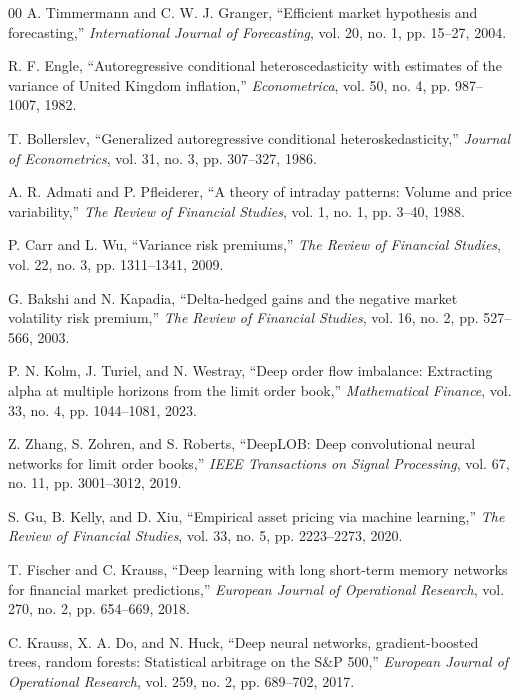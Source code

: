 \documentclass[conference]{IEEEtran}
\begin{document}
\begin{thebibliography}{00}
 A. Timmermann and C. W. J. Granger, ``Efficient market
hypothesis and forecasting,'' \emph{International Journal of Forecasting},
vol. 20, no. 1, pp. 15--27, 2004.

 R. F. Engle, ``Autoregressive conditional
heteroscedasticity with estimates of the variance of United Kingdom
inflation,'' \emph{Econometrica}, vol. 50, no. 4, pp. 987--1007, 1982.

 T. Bollerslev, ``Generalized autoregressive conditional
heteroskedasticity,'' \emph{Journal of Econometrics}, vol. 31, no. 3,
pp. 307--327, 1986.

 A. R. Admati and P. Pfleiderer, ``A theory of intraday
patterns: Volume and price variability,'' \emph{The Review of Financial
Studies}, vol. 1, no. 1, pp. 3--40, 1988.

 P. Carr and L. Wu, ``Variance risk premiums,'' \emph{The
Review of Financial Studies}, vol. 22, no. 3, pp. 1311--1341, 2009.

 G. Bakshi and N. Kapadia, ``Delta-hedged gains and the
negative market volatility risk premium,'' \emph{The Review of Financial
Studies}, vol. 16, no. 2, pp. 527--566, 2003.

 P. N. Kolm, J. Turiel, and N. Westray, ``Deep order flow
imbalance: Extracting alpha at multiple horizons from the limit order book,''
\emph{Mathematical Finance}, vol. 33, no. 4, pp. 1044--1081, 2023.

 Z. Zhang, S. Zohren, and S. Roberts, ``DeepLOB: Deep
convolutional neural networks for limit order books,'' \emph{IEEE Transactions
on Signal Processing}, vol. 67, no. 11, pp. 3001--3012, 2019.

 S. Gu, B. Kelly, and D. Xiu, ``Empirical asset pricing via
machine learning,'' \emph{The Review of Financial Studies}, vol. 33, no. 5,
pp. 2223--2273, 2020.

 T. Fischer and C. Krauss, ``Deep learning with long
short-term memory networks for financial market predictions,'' \emph{European
Journal of Operational Research}, vol. 270, no. 2, pp. 654--669, 2018.

 C. Krauss, X. A. Do, and N. Huck, ``Deep neural networks,
gradient-boosted trees, random forests: Statistical arbitrage on the
S\&P 500,'' \emph{European Journal of Operational Research}, vol. 259, no. 2,
pp. 689--702, 2017.


\end{thebibliography}
\end{document}
